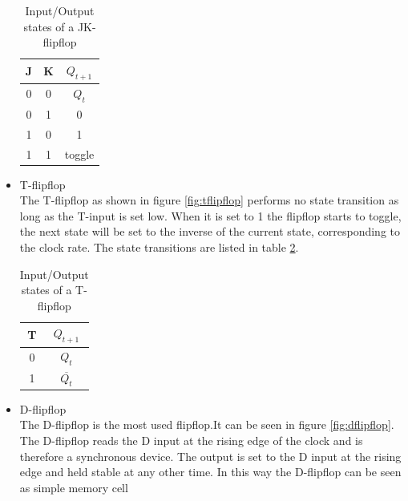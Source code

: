 \begin{itemize}
\begin{table}
\begin{center}
\begin{tabular}{|c|c||c|}
\hline
J &  K & $Q_{t+1}$\\
\hline\hline
0 & 0 & $Q_{t}$\\
\hline
0 & 1 & 0\\
\hline
1 & 0 & 1\\
\hline
1 & 1 & toggle\\
\hline
\end{tabular}
\caption{Input/Output states of a JK-flipflop}
\label{tab:jkstates}
\end{center}
\end{table}

\item T-flipflop\\
The T-flipflop as shown in figure \ref{fig:tflipflop} performs no state transition as long as the T-input is set low. When it is set to 1 the flipflop starts to toggle, the next state will be set to the inverse of the current state, corresponding to the clock rate. The state transitions are listed in table \ref{tab:tstates}.
\begin{table}
\begin{center}
\begin{tabular}{|c||c|}
\hline
T & $Q_{t+1}$\\
\hline\hline
0  & $Q_{t}$\\
\hline
1  & $\overline{Q_{t}}$\\
\hline
\end{tabular}
\caption{Input/Output states of a T-flipflop}
\label{tab:tstates}
\end{center}
\end{table}

\item D-flipflop\\
The D-flipflop is the most used flipflop.It can be seen in figure \ref{fig:dflipflop}. The D-flipflop reads the D input at the rising edge of the clock and is therefore a synchronous device. The output is set to the D input at the rising edge and held stable at any other time. In this way the D-flipflop can be seen as simple memory cell

\end{itemize}

